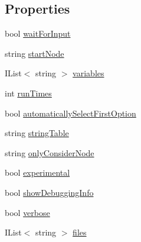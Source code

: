 \subsection*{Properties}
\begin{DoxyCompactItemize}
\item 
bool \hyperlink{a00157_a4b385e83338d14947c4d840d2d1ee266}{wait\-For\-Input}
\item 
string \hyperlink{a00157_a785bd0f1c8b6674e7a1cfbe38c29b961}{start\-Node}
\item 
I\-List$<$ string $>$ \hyperlink{a00157_a2222c73ce5366b02490c6123b711f596}{variables}
\item 
int \hyperlink{a00157_a525bb1890b29f86002c2f163ace4a3d8}{run\-Times}
\item 
bool \hyperlink{a00157_ae21d271c37dabee023771a951f6e774e}{automatically\-Select\-First\-Option}
\item 
string \hyperlink{a00103_a7e43c3b73722956cb0f5d507e4eef527}{string\-Table}
\item 
string \hyperlink{a00103_af4c0062a1d46281d377f87084fde374e}{only\-Consider\-Node}
\item 
bool \hyperlink{a00103_ad97950e47ce2aaeb598295b7c3c44b13}{experimental}
\item 
bool \hyperlink{a00041_a89964ea17bd19caf00cb5bff563ed01c}{show\-Debugging\-Info}
\item 
bool \hyperlink{a00041_ada4d83d1756918f362d55f6649b82b17}{verbose}
\item 
I\-List$<$ string $>$ \hyperlink{a00041_aa93cbb1bc1d5328e0a417012621e92d2}{files}
\end{DoxyCompactItemize}


